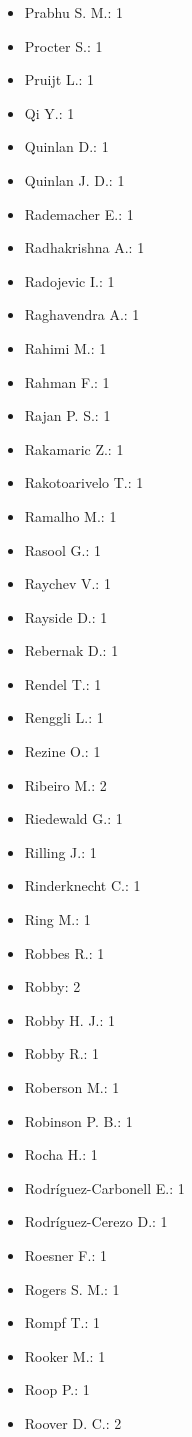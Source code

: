 \begin{itemize}
\item Prabhu S. M.: 1
\item Procter S.: 1
\item Pruijt L.: 1
\item Qi Y.: 1
\item Quinlan D.: 1
\item Quinlan J. D.: 1
\item Rademacher E.: 1
\item Radhakrishna A.: 1
\item Radojevic I.: 1
\item Raghavendra A.: 1
\item Rahimi M.: 1
\item Rahman F.: 1
\item Rajan P. S.: 1
\item Rakamaric Z.: 1
\item Rakotoarivelo T.: 1
\item Ramalho M.: 1
\item Rasool G.: 1
\item Raychev V.: 1
\item Rayside D.: 1
\item Rebernak D.: 1
\item Rendel T.: 1
\item Renggli L.: 1
\item Rezine O.: 1
\item Ribeiro M.: 2
\item Riedewald G.: 1
\item Rilling J.: 1
\item Rinderknecht C.: 1
\item Ring M.: 1
\item Robbes R.: 1
\item Robby: 2
\item Robby H. J.: 1
\item Robby R.: 1
\item Roberson M.: 1
\item Robinson P. B.: 1
\item Rocha H.: 1
\item Rodríguez-Carbonell E.: 1
\item Rodríguez-Cerezo D.: 1
\item Roesner F.: 1
\item Rogers S. M.: 1
\item Rompf T.: 1
\item Rooker M.: 1
\item Roop P.: 1
\item Roover D. C.: 2

\end{itemize}
